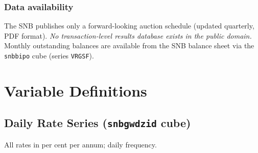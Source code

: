 \documentclass[12pt,a4paper]{article}
\begin{document}
\subsubsection{Data availability}

The SNB publishes only a forward-looking auction schedule (updated quarterly,
PDF format).  \emph{No transaction-level results database exists in the public
domain.}  Monthly outstanding balances are available from the SNB balance sheet
via the \texttt{snbbipo} cube (series \texttt{VRGSF}).

\section{Variable Definitions}

\subsection{Daily Rate Series (\texttt{snbgwdzid} cube)}

All rates in per cent per annum; daily frequency.
\end{document}
